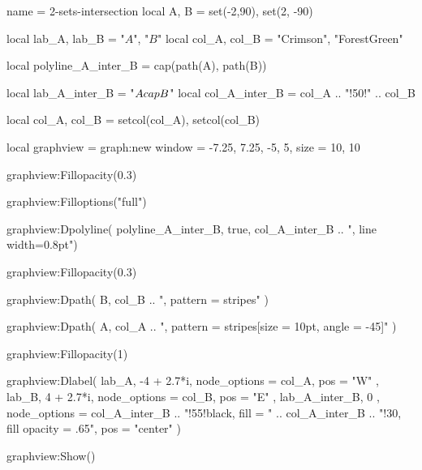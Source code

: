 \documentclass{standalone}
\begin{document}
\begin{luadraw}{name = 2-sets-intersection}
  local A, B = set(-2,90), set(2, -90)

  local lab_A, lab_B = "$A$", "$B$"
  local col_A, col_B = "Crimson", "ForestGreen"

  local polyline_A_inter_B = cap(path(A), path(B))

  local lab_A_inter_B = "$A \\cap B$"
  local col_A_inter_B = col_A .. "!50!" .. col_B

  local col_A, col_B = setcol(col_A), setcol(col_B)

  local graphview = graph:new{
    window = {-7.25, 7.25, -5, 5},
    size   = {10, 10}
  }

  graphview:Fillopacity(0.3)

  graphview:Filloptions("full")

  graphview:Dpolyline(
    polyline_A_inter_B,
    true,
    col_A_inter_B .. ", line width=0.8pt")

  graphview:Fillopacity(0.3)

  graphview:Dpath(
    B,
    col_B .. ", pattern = stripes"
  )

  graphview:Dpath(
    A,
    col_A .. ", pattern = {stripes[size = 10pt, angle = -45]}"
  )

  graphview:Fillopacity(1)

  graphview:Dlabel(
    lab_A, -4 + 2.7*i, {
      node_options = col_A,
      pos = "W"
    },
    lab_B, 4 + 2.7*i, {
      node_options = col_B,
      pos = "E"
    },
    lab_A_inter_B, 0 , {
      node_options =  col_A_inter_B
                   .. "!55!black, fill = "
                   .. col_A_inter_B
                   .. "!30, fill opacity = .65",
      pos = "center"
     })

  graphview:Show()
\end{luadraw}
\end{document}
